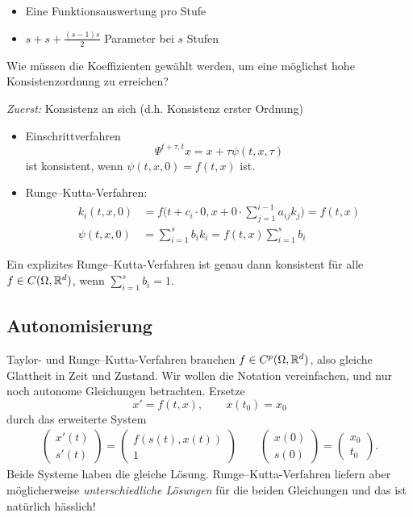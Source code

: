 \begin{itemize}
	\item Eine Funktionsauswertung pro Stufe
	\item $s + s + \frac{(s-1)s}{2}$ Parameter bei $s$ Stufen
\end{itemize}
Wie müssen die Koeffizienten gewählt werden, um eine möglichst hohe Konsistenzordnung zu erreichen?

\emph{Zuerst:} Konsistenz an sich (d.h. Konsistenz erster Ordnung)
\begin{itemize}
	\item Einschrittverfahren
	\begin{equation*}
		\Psi^{t+\tau,t} x=x+\tau \psi (t,x,\tau)
	\end{equation*}
	ist konsistent, wenn $\psi (t,x,0)=f(t,x)$ ist.
	
	\item Runge--Kutta-Verfahren:
	\begin{align*}
		k_i(t,x,0) 
		&= f \bigg(t+c_i \cdot 0,x+0 \cdot \sum_{j=1}^{i-1} a_{ij}k_j \bigg)
		= f(t,x)
		\\
		\psi (t,x,0) 
		&= \sum_{i=1}^s b_ik_i
		= f(t,x) \sum_{i=1}^s b_i
	\end{align*}
\end{itemize}

\begin{lemma}
	Ein explizites Runge--Kutta-Verfahren ist genau dann konsistent für alle $f \in C(\Omega,\mathbb R^d)$, wenn $\sum_{i=1}^s b_i = 1$.
\end{lemma}


\subsection{Autonomisierung}

Taylor- und Runge--Kutta-Verfahren brauchen $f \in C^p(\Omega,\mathbb R^d)$, also gleiche Glattheit in Zeit und Zustand. Wir wollen die Notation vereinfachen, und nur noch autonome Gleichungen betrachten. Ersetze
\begin{equation*}
  x' = f(t,x),
  \qquad
  x(t_0) = x_0
\end{equation*}
durch das erweiterte System
\begin{align*}
	\begin{pmatrix} x'(t) \\ s' (t) \end{pmatrix}
	= \begin{pmatrix} f (s(t),x(t)) \\ 1 \end{pmatrix} \qquad
	\begin{pmatrix} x(0) \\ s(0) \end{pmatrix}
	= \begin{pmatrix} x_0 \\ t_0 \end{pmatrix}.
\end{align*}
Beide Systeme haben die gleiche Lösung.
Runge--Kutta-Verfahren liefern aber möglicherweise \textit{unterschiedliche Lösungen} für die beiden Gleichungen und das ist natürlich hässlich!

